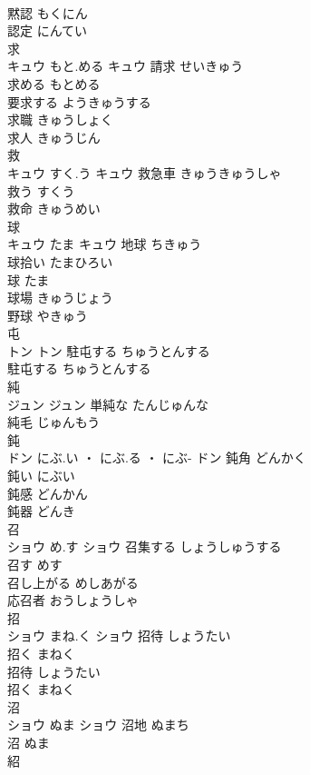 \documentclass[8pt]{extreport}
\begin{document}
\begin{CJK}{UTF8}{min}
\\	黙認	もくにん	
\\	認定	にんてい	
\\	求	
\\	キュウ	もと.める	キュウ	請求	せいきゅう	
\\	求める	もとめる	
\\	要求する	ようきゅうする	
\\	求職	きゅうしょく	
\\	求人	きゅうじん	
\\	救	
\\	キュウ	すく.う	キュウ	救急車	きゅうきゅうしゃ	
\\	救う	すくう	
\\	救命	きゅうめい	
\\	球	
\\	キュウ	たま	キュウ	地球	ちきゅう	
\\	球拾い	たまひろい	
\\	球	たま	
\\	球場	きゅうじょう	
\\	野球	やきゅう	
\\	屯	
\\	トン		トン	駐屯する	ちゅうとんする	
\\	駐屯する	ちゅうとんする	
\\	純	
\\	ジュン		ジュン	単純な	たんじゅんな	
\\	純毛	じゅんもう	
\\	鈍	
\\	ドン	にぶ.い ・ にぶ.る ・ にぶ-	ドン	鈍角	どんかく	
\\	鈍い	にぶい	
\\	鈍感	どんかん	
\\	鈍器	どんき	
\\	召	
\\	ショウ	め.す	ショウ	召集する	しょうしゅうする	
\\	召す	めす	
\\	召し上がる	めしあがる	
\\	応召者	おうしょうしゃ	
\\	招	
\\	ショウ	まね.く	ショウ	招待	しょうたい	
\\	招く	まねく	
\\	招待	しょうたい	
\\	招く	まねく	
\\	沼	
\\	ショウ	ぬま	ショウ	沼地	ぬまち	
\\	沼	ぬま	
\\	紹	

\end{CJK}
\end{document}
